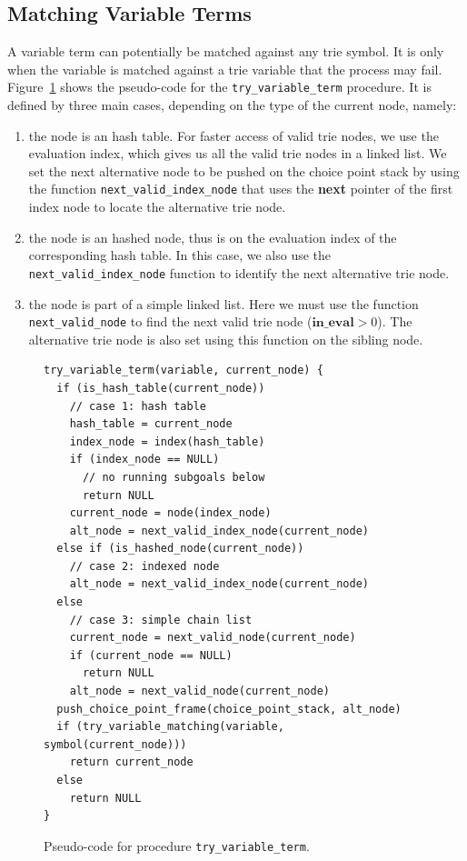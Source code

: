 \subsection{Matching Variable Terms}

A variable term can potentially be matched against any trie symbol. It
is only when the variable is matched against a trie variable that the
process may fail. Figure~\ref{fig:try_variable_term} shows the
pseudo-code for the \texttt{try\_variable\_term} procedure. It is defined
by three main cases, depending on the type of the current node, namely:

\begin{enumerate}
\item the node is an hash table. For faster access of valid trie  nodes, we use the evaluation index, which gives us all the valid
  trie nodes in a linked list. We set the next alternative node to be  pushed on the choice point stack by using the function
  \texttt{next\_valid\_index\_node} that uses the \textbf{next} pointer of the  first index node to locate the alternative trie node.
\item the node is an hashed node, thus is on the evaluation index of  the corresponding hash table. In this case, we also use the
  \texttt{next\_valid\_index\_node} function to identify the next
  alternative trie node.\item the node is part of a simple linked list. Here we must use the
  function \texttt{next\_valid\_node} to find the next valid trie node
  ($\textbf{in\_eval} > 0$). The alternative trie node is also set using this
  function on the sibling node.
\end{enumerate}

\begin{figure}[ht]
\begin{Verbatim}
try_variable_term(variable, current_node) {
  if (is_hash_table(current_node))
    // case 1: hash table
    hash_table = current_node
    index_node = index(hash_table)    
    if (index_node == NULL)
      // no running subgoals below
      return NULL    
    current_node = node(index_node)
    alt_node = next_valid_index_node(current_node)
  else if (is_hashed_node(current_node))
    // case 2: indexed node
    alt_node = next_valid_index_node(current_node)
  else
    // case 3: simple chain list
    current_node = next_valid_node(current_node)
    if (current_node == NULL)
      return NULL
    alt_node = next_valid_node(current_node)
  push_choice_point_frame(choice_point_stack, alt_node)
  if (try_variable_matching(variable, symbol(current_node)))
    return current_node
  else
    return NULL
}
\end{Verbatim}
\caption{Pseudo-code for procedure \texttt{try\_variable\_term}.}
\label{fig:try_variable_term}
\end{figure}

